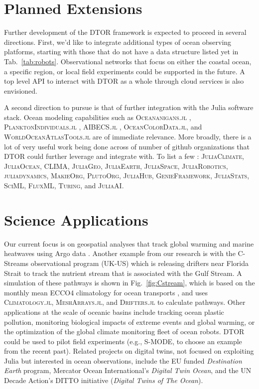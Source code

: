\documentclass{juliacon}[12pt]
\newcommand{\pkg}[1]{{\small \textsc{#1}}}
\begin{document}
\section{Planned Extensions}

Further development of the DTOR framework is expected to proceed in several directions. First, we'd like to integrate additional types of ocean observing platforms, starting with those that do not have a data structure listed yet in Tab.~\ref{tab:robots}. Observational networks that focus on either the coastal ocean, a specific region, or local field experiments could be supported in the future. A top level API to interact with DTOR as a whole through cloud services is also envisioned.

A second direction to pursue is that of further integration with the Julia software stack. Ocean modeling capabilities such as \pkg{Oceananigans.jl} \cite{OceananigansJOSS}, \pkg{PlanktonIndividuals.jl} \cite{Wu2022}, \pkg{AIBECS.jl} \cite{Pasquier2022}, \pkg{OceanColorData.jl}, and \pkg{WorldOceanAtlasTools.jl} are of immediate relevance. More broadly, there is a lot of very useful work being done across of number of github organizations that DTOR could further leverage and integrate with. To list a few : \pkg{JuliaClimate}, \pkg{JuliaOcean}, \pkg{CLIMA}, \pkg{JuliaGeo}, \pkg{JuliaEarth}, \pkg{JuliaSpace}, \pkg{JuliaRobotics}, \pkg{juliadynamics}, \pkg{MakieOrg}, \pkg{PlutoOrg}, \pkg{JuliaHub}, \pkg{GenieFramework}, \pkg{JuliaStats}, \pkg{SciML}, \pkg{FluxML}, \pkg{Turing}, and \pkg{JuliaAI}. 

\section{Science Applications}

Our current focus is on geospatial analyses that track global warming and marine heatwaves using Argo data \cite{Forget2024a}. Another example from our research is with the C-Streams observational program (UK-US) which is releasing drifters near Florida Strait to track the nutrient stream that is associated with the Gulf Stream. A simulation of these pathways is shown in Fig.~\ref{fig:Cstream}, which is based on the monthly mean ECCO4 climatology for ocean transports \cite{Forget2015a,Forget2019,Rousselet2021}, and uses \pkg{Climatology.jl}, \pkg{MeshArrays.jl}, and \pkg{Drifters.jl} to calculate pathways. Other applications at the scale of oceanic basins include tracking ocean plastic pollution, monitoring biological impacts of extreme events and global warming, or the optimization of the global climate monitoring fleet of ocean robots. DTOR could be used to pilot field experiments (e.g., S-MODE, to choose an example from the recent past). Related projects on digital twins, not focused on exploiting Julia but interested in ocean observations, include the EU funded {\it Destination Earth} program, Mercator Ocean International's {\it Digital Twin Ocean}, and the UN Decade Action's DITTO initiative ({\it Digital Twins of The Ocean}).
\end{document}
